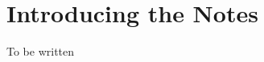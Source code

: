 \documentclass[../../../main.tex]{subfiles}
\begin{document}
\chapter*{Introducing the Notes}

To be written

\cite{MATH03-1}
\cite{MATH03-2}
\end{document}
